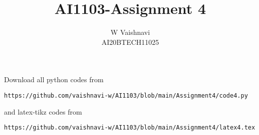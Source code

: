 \documentclass[journal,12pt,twocolumn]{IEEEtran}
\DeclareMathOperator*{\Res}{Res}
\begin{document}
\newcommand{\BEQA}{\begin{eqnarray}}
\newcommand{\EEQA}{\end{eqnarray}}
\newcommand{\define}{\stackrel{\triangle}{=}}

\raggedbottom
\setlength{\parindent}{0pt}
\providecommand{\mbf}{\mathbf}
\providecommand{\pr}[1]{\ensuremath{\Pr\left(#1\right)}}
\providecommand{\qfunc}[1]{\ensuremath{Q\left(#1\right)}}
\providecommand{\sbrak}[1]{\ensuremath{{}\left[#1\right]}}
\providecommand{\lsbrak}[1]{\ensuremath{{}\left[#1\right.}}
\providecommand{\rsbrak}[1]{\ensuremath{{}\left.#1\right]}}
\providecommand{\brak}[1]{\ensuremath{\left(#1\right)}}
\providecommand{\lbrak}[1]{\ensuremath{\left(#1\right.}}
\providecommand{\rbrak}[1]{\ensuremath{\left.#1\right)}}
\providecommand{\cbrak}[1]{\ensuremath{\left\{#1\right\}}}
\providecommand{\lcbrak}[1]{\ensuremath{\left\{#1\right.}}
\providecommand{\rcbrak}[1]{\ensuremath{\left.#1\right\}}}
\theoremstyle{remark}
\newtheorem{rem}{Remark}
\newcommand{\sgn}{\mathop{\mathrm{sgn}}}
\providecommand{\abs}[1]{\vert#1\vert}
\providecommand{\res}[1]{\Res\displaylimits_{#1}} 
\providecommand{\norm}[1]{\lVert#1\rVert}
\providecommand{\mtx}[1]{\mathbf{#1}}
\providecommand{\mean}[1]{E[ #1 ]}
\providecommand{\fourier}{\overset{\mathcal{F}}{ \rightleftharpoons}}
\providecommand{\system}{\overset{\mathcal{H}}{ \longleftrightarrow}}
\newcommand{\solution}{\noindent \textbf{Solution: }}
\newcommand{\cosec}{\,\text{cosec}\,}
\providecommand{\dec}[2]{\ensuremath{\overset{#1}{\underset{#2}{\gtrless}}}}
\newcommand{\myvec}[1]{\ensuremath{\begin{pmatrix}#1\end{pmatrix}}}
\newcommand{\mydet}[1]{\ensuremath{\begin{vmatrix}#1\end{vmatrix}}}
\makeatletter
{}
\makeatother
\let\StandardTheFigure\thefigure
\let\vec\mathbf
\renewcommand{\thefigure}{\theproblem}
\def\putbox#1#2#3{\makebox[0in][l]{\makebox[#1][l]{}\raisebox{\baselineskip}[0in][0in]{\raisebox{#2}[0in][0in]{#3}}}}
     \def\rightbox#1{\makebox[0in][r]{#1}}
     \def\centbox#1{\makebox[0in]{#1}}
     \def\topbox#1{\raisebox{-\baselineskip}[0in][0in]{#1}}
     \def\midbox#1{\raisebox{-0.5\baselineskip}[0in][0in]{#1}}
\vspace{3cm}
\title{AI1103-Assignment 4}
\author{W Vaishnavi\\AI20BTECH11025}
\maketitle
\newpage
\bigskip
\renewcommand{\thefigure}{\theenumi}
\renewcommand{\thetable}{\theenumi}
Download all python codes from 
%
\begin{lstlisting}
https://github.com/vaishnavi-w/AI1103/blob/main/Assignment4/code4.py
\end{lstlisting}
and latex-tikz codes from 
%
\begin{lstlisting}
https://github.com/vaishnavi-w/AI1103/blob/main/Assignment4/latex4.tex
\end{lstlisting}
\end{document}
